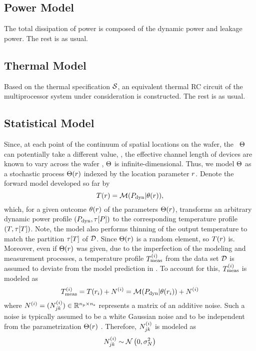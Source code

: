 \subsection{Power Model}
The total dissipation of power is composed of the dynamic power and leakage power. The rest is as usual.

\subsection{Thermal Model}
Based on the thermal specification $\mathcal{S}$, an equivalent thermal RC circuit of the multiprocessor system under consideration is constructed. The rest is as usual.

\subsection{Statistical Model}
Since, at each point of the continuum of spatial locations on the wafer, the \rv\ $\Theta$ can potentially take a different value, \eg, the effective channel length of devices are known to vary across the wafer \cite{cheng2011}, $\Theta$ is infinite-dimensional. Thus, we model $\Theta$ as a stochastic process $\Theta(r)$ indexed by the location parameter $r$. Denote the forward model developed so far by
\begin{equation} \elabel{model}
  \mT(\r) = \model{\mP_\dyn | \u(\r)},
\end{equation}
which, for a given outcome $\theta(r)$ of the parameters $\Theta(r)$, transforms an arbitrary dynamic power profile $(P_{\text{dyn}}, \tau[P])$ to the corresponding temperature profile $\profileT$. Note, the model also performs thinning of the output temperature to match the partition $\tau[T]$ of $\mathcal{D}$. Since $\Theta(r)$ is a random element, so $T(r)$ is. Moreover, even if $\Theta(r)$ was given, due to the imperfection of the modeling and measurement processes, a temperature profile $T^{(i)}_{\text{meas}}$ from the data set $\mathcal{D}$ is assumed to deviate from the model prediction in . To account for this, $T^{(i)}_{\text{meas}}$ is modeled as
\[
  T^{(i)}_{\text{meas}} = T(r_i) + N^{(i)} = \mathcal{M}( P_{\text{dyn}} | \theta(r_i) ) + N^{(i)}
\]
where $N^{(i)} = (N^{(i)}_{jk}) \in \mathbb{R}^{{n_\text{p}} \times n_\text{s}}$ represents a matrix of an additive noise. Such a noise is typically assumed to be a white Gaussian noise and to be independent from the parametrization $\Theta(r)$ \cite{marzouk2007, el-moselhy2012}. Therefore, $N^{(i)}_{jk}$ is modeled as
\[
  N^{(i)}_{jk} \sim \mathcal{N}\left(0, \sigma^2_N\right)
\]
